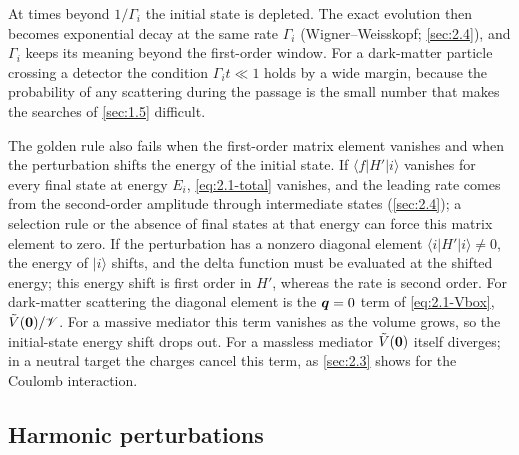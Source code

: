 At times beyond $1/\varGamma_i$ the initial state is depleted. The exact evolution then becomes exponential decay at the same rate $\varGamma_i$ (Wigner--Weisskopf; \cref{sec:2.4}), and $\varGamma_i$ keeps its meaning beyond the first-order window. For a dark-matter particle crossing a detector the condition $\varGamma_i t \ll 1$ holds by a wide margin, because the probability of any scattering during the passage is the small number that makes the searches of \cref{sec:1.5} difficult.

The golden rule also fails when the first-order matrix element vanishes and when the perturbation shifts the energy of the initial state. If $\langle f|H'|i\rangle$ vanishes for every final state at energy $E_i$, \cref{eq:2.1-total} vanishes, and the leading rate comes from the second-order amplitude through intermediate states (\cref{sec:2.4}); a selection rule or the absence of final states at that energy can force this matrix element to zero. If the perturbation has a nonzero diagonal element $\langle i|H'|i\rangle \neq 0$, the energy of $|i\rangle$ shifts, and the delta function must be evaluated at the shifted energy; this energy shift is first order in $H'$, whereas the rate is second order. For dark-matter scattering the diagonal element is the $\bm{q} = 0$ term of \cref{eq:2.1-Vbox}, $\tilde V(\bm{0})/\mathscr{V}$. For a massive mediator this term vanishes as the volume grows, so the initial-state energy shift drops out. For a massless mediator $\tilde V(\bm{0})$ itself diverges; in a neutral target the charges cancel this term, as \cref{sec:2.3} shows for the Coulomb interaction.

\subsection{Harmonic perturbations}

